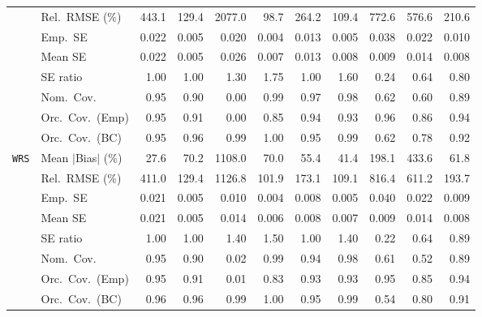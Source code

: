 \begin{landscape}
\begin{longtable}{llrrrrrrrrr}
 & Rel.\ RMSE (\%) & 443.1 & \cellcolor{rankthree}129.4 & 2077.0 & \cellcolor{rankone}98.7 & 264.2 & \cellcolor{ranktwo}109.4 & 772.6 & 576.6 & 210.6 \\
 & Emp.\ SE & 0.022 & 0.005 & 0.020 & 0.004 & 0.013 & 0.005 & 0.038 & 0.022 & 0.010 \\
 & Mean SE & 0.022 & 0.005 & 0.026 & 0.007 & 0.013 & 0.008 & 0.009 & 0.014 & 0.008 \\
 & SE ratio & \cellcolor{rankone}1.00 & \cellcolor{rankone}1.00 & \cellcolor{rankthree}1.30 & 1.75 & \cellcolor{rankone}1.00 & 1.60 & 0.24 & 0.64 & \cellcolor{ranktwo}0.80 \\
 & Nom.\ Cov. & \cellcolor{rankone}0.95 & 0.90 & 0.00 & 0.99 & \cellcolor{ranktwo}0.97 & \cellcolor{rankthree}0.98 & 0.62 & 0.60 & 0.89 \\
 & Orc.\ Cov.\ (Emp) & \cellcolor{rankone}0.95 & 0.91 & 0.00 & 0.85 & \cellcolor{ranktwo}0.94 & \cellcolor{rankthree}0.93 & \cellcolor{ranktwo}0.96 & 0.86 & \cellcolor{ranktwo}0.94 \\
 & Orc.\ Cov.\ (BC) & \cellcolor{rankone}0.95 & \cellcolor{ranktwo}0.96 & 0.99 & 1.00 & \cellcolor{rankone}0.95 & 0.99 & 0.62 & 0.78 & \cellcolor{rankthree}0.92 \\
\addlinespace[2pt]
\quad \texttt{WRS} & Mean $|$Bias$|$ (\%) & \cellcolor{rankone}27.6 & 70.2 & 1108.0 & 70.0 & \cellcolor{rankthree}55.4 & \cellcolor{ranktwo}41.4 & 198.1 & 433.6 & 61.8 \\
 & Rel.\ RMSE (\%) & 411.0 & \cellcolor{rankthree}129.4 & 1126.8 & \cellcolor{rankone}101.9 & 173.1 & \cellcolor{ranktwo}109.1 & 816.4 & 611.2 & 193.7 \\
 & Emp.\ SE & 0.021 & 0.005 & 0.010 & 0.004 & 0.008 & 0.005 & 0.040 & 0.022 & 0.009 \\
 & Mean SE & 0.021 & 0.005 & 0.014 & 0.006 & 0.008 & 0.007 & 0.009 & 0.014 & 0.008 \\
 & SE ratio & \cellcolor{rankone}1.00 & \cellcolor{rankone}1.00 & 1.40 & 1.50 & \cellcolor{rankone}1.00 & 1.40 & 0.22 & \cellcolor{rankthree}0.64 & \cellcolor{ranktwo}0.89 \\
 & Nom.\ Cov. & \cellcolor{rankone}0.95 & 0.90 & 0.02 & 0.99 & \cellcolor{ranktwo}0.94 & \cellcolor{rankthree}0.98 & 0.61 & 0.52 & 0.89 \\
 & Orc.\ Cov.\ (Emp) & \cellcolor{rankone}0.95 & 0.91 & 0.01 & 0.83 & \cellcolor{rankthree}0.93 & \cellcolor{rankthree}0.93 & \cellcolor{rankone}0.95 & 0.85 & \cellcolor{ranktwo}0.94 \\
 & Orc.\ Cov.\ (BC) & \cellcolor{ranktwo}0.96 & \cellcolor{ranktwo}0.96 & \cellcolor{rankthree}0.99 & 1.00 & \cellcolor{rankone}0.95 & \cellcolor{rankthree}0.99 & 0.54 & 0.80 & \cellcolor{rankthree}0.91 \\

\end{longtable}
\end{landscape}
